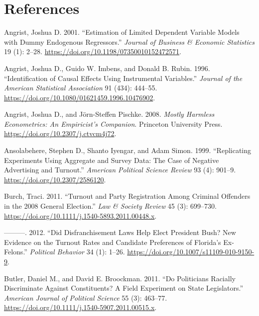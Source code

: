 \documentclass[
  12pt,
]{article}
\newlength{\cslhangindent}
\newenvironment{cslreferences}%
  {\setlength{\parindent}{0pt}%
  \everypar{\setlength{\hangindent}{\cslhangindent}}\ignorespaces}%
  {\par}
\begin{document}
\newpage

\hypertarget{references}{%
\section*{References}\label{references}}

\hypertarget{refs}{}
\begin{cslreferences}
\leavevmode\hypertarget{ref-Angrist2001}{}%
Angrist, Joshua D. 2001. ``Estimation of Limited Dependent Variable Models with Dummy Endogenous Regressors.'' \emph{Journal of Business \& Economic Statistics} 19 (1): 2--28. \url{https://doi.org/10.1198/07350010152472571}.

\leavevmode\hypertarget{ref-Angrist1996}{}%
Angrist, Joshua D., Guido W. Imbens, and Donald B. Rubin. 1996. ``Identification of Causal Effects Using Instrumental Variables.'' \emph{Journal of the American Statistical Association} 91 (434): 444--55. \url{https://doi.org/10.1080/01621459.1996.10476902}.

\leavevmode\hypertarget{ref-Angrist2008}{}%
Angrist, Joshua D., and Jörn-Steffen Pischke. 2008. \emph{Mostly Harmless Econometrics: An Empiricist's Companion}. Princeton University Press. \url{https://doi.org/10.2307/j.ctvcm4j72}.

\leavevmode\hypertarget{ref-Ansolabehere1999}{}%
Ansolabehere, Stephen D., Shanto Iyengar, and Adam Simon. 1999. ``Replicating Experiments Using Aggregate and Survey Data: The Case of Negative Advertising and Turnout.'' \emph{American Political Science Review} 93 (4): 901--9. \url{https://doi.org/10.2307/2586120}.

\leavevmode\hypertarget{ref-Burch2011}{}%
Burch, Traci. 2011. ``Turnout and Party Registration Among Criminal Offenders in the 2008 General Election.'' \emph{Law \& Society Review} 45 (3): 699--730. \url{https://doi.org/10.1111/j.1540-5893.2011.00448.x}.

\leavevmode\hypertarget{ref-Burch2012}{}%
---------. 2012. ``Did Disfranchisement Laws Help Elect President Bush? New Evidence on the Turnout Rates and Candidate Preferences of Florida's Ex-Felons.'' \emph{Political Behavior} 34 (1): 1--26. \url{https://doi.org/10.1007/s11109-010-9150-9}.

\leavevmode\hypertarget{ref-Butler2011}{}%
Butler, Daniel M., and David E. Broockman. 2011. ``Do Politicians Racially Discriminate Against Constituents? A Field Experiment on State Legislators.'' \emph{American Journal of Political Science} 55 (3): 463--77. \url{https://doi.org/10.1111/j.1540-5907.2011.00515.x}.


\end{cslreferences}
\end{document}
